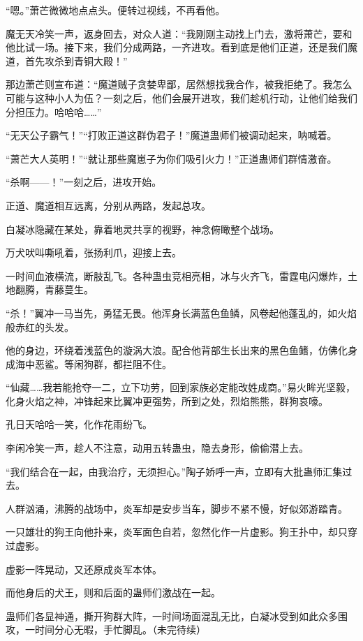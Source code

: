 \begin{this_body}
“嗯。”萧芒微微地点点头。便转过视线，不再看他。

魔无天冷笑一声，返身回去，对众人道：“我刚刚主动找上门去，激将萧芒，要和他比试一场。接下来，我们分成两路，一齐进攻。看到底是他们正道，还是我们魔道，首先攻杀到青铜大殿！”

那边萧芒则宣布道：“魔道贼子贪婪卑鄙，居然想找我合作，被我拒绝了。我怎么可能与这种小人为伍？一刻之后，他们会展开进攻，我们趁机行动，让他们给我们分担压力。哈哈哈……”

“无天公子霸气！”“打败正道这群伪君子！”魔道蛊师们被调动起来，呐喊着。

“萧芒大人英明！”“就让那些魔崽子为你们吸引火力！”正道蛊师们群情激奋。

“杀啊——！”一刻之后，进攻开始。

正道、魔道相互远离，分别从两路，发起总攻。

白凝冰隐藏在某处，靠着地灵共享的视野，神念俯瞰整个战场。

万犬吠叫嘶吼着，张扬利爪，迎接上去。

一时间血液横流，断肢乱飞。各种蛊虫竞相亮相，冰与火齐飞，雷霆电闪爆炸，土地翻腾，青藤蔓生。

“杀！”翼冲一马当先，勇猛无畏。他浑身长满蓝色鱼鳞，风卷起他蓬乱的，如火焰般赤红的头发。

他的身边，环绕着浅蓝色的漩涡大浪。配合他背部生长出来的黑色鱼鳍，仿佛化身成海中恶鲨。等闲狗群，都拦阻不住。

“仙藏……我若能抢夺一二，立下功劳，回到家族必定能改姓成商。”易火眸光坚毅，化身火焰之神，冲锋起来比翼冲更强势，所到之处，烈焰熊熊，群狗哀嚎。

孔日天哈哈一笑，化作花雨纷飞。

李闲冷笑一声，趁人不注意，动用五转蛊虫，隐去身形，偷偷潜上去。

“我们结合在一起，由我治疗，无须担心。”陶子娇呼一声，立即有大批蛊师汇集过去。

人群汹涌，沸腾的战场中，炎军却是安步当车，脚步不紧不慢，好似郊游踏青。

一只雄壮的狗王向他扑来，炎军面色自若，忽然化作一片虚影。狗王扑中，却只穿过虚影。

虚影一阵晃动，又还原成炎军本体。

而他身后的犬王，则和后面的蛊师们激战在一起。

蛊师们各显神通，撕开狗群大阵，一时间场面混乱无比，白凝冰受到如此众多围攻，一时间分心无暇，手忙脚乱。（未完待续）

\end{this_body}

